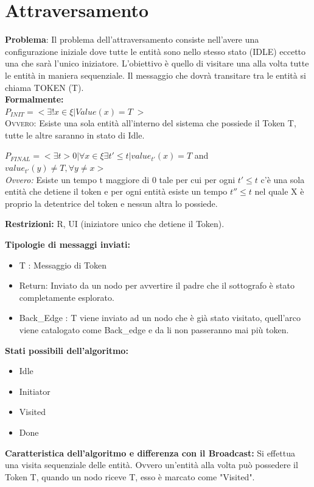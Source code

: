 \chapter{Attraversamento}

\textbf{Problema}: Il problema dell'attraversamento consiste nell'avere una configurazione iniziale dove tutte le entità sono nello stesso stato (IDLE) eccetto una che sarà l'unico iniziatore. L'obiettivo è quello di visitare una alla volta tutte le entità in maniera sequenziale. Il messaggio che dovrà transitare tra le entità si chiama TOKEN (T).\\
\textbf{Formalmente:}\\
$
P_{INIT} = <\exists ! x \in \xi | Value(x) = T \;>
$\\
\textsc{Ovvero:} Esiste una sola entità all'interno del sistema che possiede il Token T, tutte le altre saranno in stato di Idle.

$P_{FINAL} = <\exists t>0 | \forall x \in \xi \exists t' \leq t | value_{t'}(x) = T$ and $value_{t'}(y) \neq T, \forall y \neq x >$\\
\textit{Ovvero:} Esiste un tempo t maggiore di 0 tale per cui per ogni $t' \leq t$ c'è una sola entità che detiene il token e per ogni entità esiste un tempo $t'' \leq t$ nel quale X è proprio la detentrice del token e nessun altra lo possiede.

\textbf{Restrizioni:} R, UI (iniziatore unico che detiene il Token).

\textbf{Tipologie di messaggi inviati:}
\begin{itemize}
    \item T : Messaggio di Token
    \item Return: Inviato da un nodo per avvertire il padre che il sottografo è stato completamente esplorato.
    \item Back\_Edge : T viene inviato ad un nodo che è già stato visitato, quell'arco viene catalogato come Back\_edge e da li non passeranno mai più token.
\end{itemize}
\textbf{Stati possibili dell'algoritmo:}
\begin{itemize}
    \item Idle
    \item Initiator
    \item Visited
    \item Done
\end{itemize}

\textbf{Caratteristica dell'algoritmo e differenza con il Broadcast:} Si effettua una visita sequenziale delle entità. Ovvero un'entità alla volta può possedere il Token T, quando un nodo riceve T, esso è marcato come "Visited".

